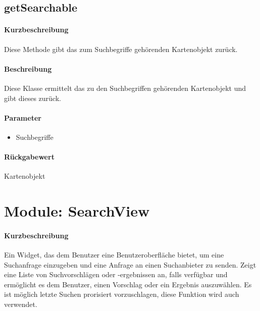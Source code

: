 \subsection{getSearchable}%
\paragraph*{Kurzbeschreibung}
Diese Methode gibt das zum Suchbegriffe gehörenden Kartenobjekt zurück.
\paragraph*{Beschreibung}
Diese Klasse ermittelt das zu den Suchbegriffen gehörenden Kartenobjekt und gibt dieses zurück.
\paragraph*{Parameter}
\begin{itemize}
    \item Suchbegriffe
\end{itemize}
\paragraph*{Rückgabewert}
Kartenobjekt


\section{Module: SearchView}
\paragraph*{Kurzbeschreibung}
Ein Widget, das dem Benutzer eine Benutzeroberfläche bietet, um eine Suchanfrage einzugeben und eine Anfrage an einen Suchanbieter zu senden. 
Zeigt eine Liste von Suchvorschlägen oder -ergebnissen an, falls verfügbar 
und ermöglicht es dem Benutzer, einen Vorschlag oder ein Ergebnis auszuwählen.
Es ist möglich letzte Suchen prorisiert vorzuschlagen, diese Funktion wird auch verwendet.

